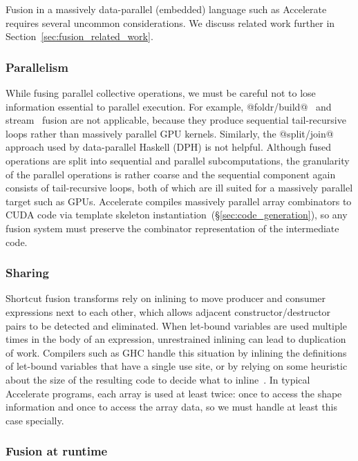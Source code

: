 Fusion in a massively data-parallel (embedded) language such as Accelerate
requires several uncommon considerations. We discuss related work further in
Section~\ref{sec:fusion_related_work}.

\subsubsection{Parallelism}

While fusing parallel collective operations, we must be careful not to lose
information essential to parallel execution. For example,
@foldr/build@~\cite{Gill:1993de} and stream~\cite{Coutts:2007kp} fusion are not
applicable, because they produce sequential tail-recursive loops rather than
massively parallel GPU kernels. Similarly, the @split/join@~\cite{Keller:1999ic}
approach used by data-parallel Haskell (DPH) is not helpful. Although fused
operations are split into sequential and parallel subcomputations, the
granularity of the parallel operations is rather coarse and the sequential
component again consists of tail-recursive loops, both of which are ill suited
for a massively parallel target such as GPUs. Accelerate compiles massively
parallel array combinators to CUDA code via template skeleton
instantiation~(\S\ref{sec:code_generation}), so any fusion system must preserve
the combinator representation of the intermediate code.


\subsubsection{Sharing}

Shortcut fusion transforms rely on inlining to move producer and consumer
expressions next to each other, which allows adjacent constructor/destructor
pairs to be detected and eliminated. When let-bound variables are used multiple
times in the body of an expression, unrestrained inlining can lead to
duplication of work. Compilers such as GHC handle this situation by inlining the
definitions of let-bound variables that have a single use site, or by relying on
some heuristic about the size of the resulting code to decide what to
inline~\cite{PeytonJones:2003gb}. In typical Accelerate programs, each array is
used at least twice: once to access the shape information and once to access the
array data, so we must handle at least this case specially.

\subsubsection{Fusion at runtime}

